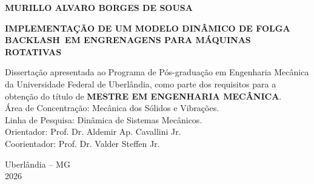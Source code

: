 
\thispagestyle{empty}

\begin{center}
	\large\bfseries\MakeUppercase{Murillo Alvaro Borges de Sousa}
\end{center}

\vspace*{\fill}
\begin{center}
	\large\bfseries\MakeUppercase{Implementação de um modelo dinâmico de folga backlash em engrenagens para máquinas rotativas}
\end{center}

\vskip48pt
\hfill
\begin{minipage}{10cm}
	Dissertação apresentada ao Programa de Pós-graduação em Engenharia Mecânica da Universidade Federal de Uberlândia, como parte dos requisitos para a obtenção do título de {\bfseries\MakeUppercase{Mestre em Engenharia Mecânica}}. \\
	\vskip 24pt
	Área de Concentração: Mecânica dos Sólidos e Vibrações. \\
	Linha de Pesquisa: Dinâmica de Sistemas Mecânicos. \\
	\vskip24pt
	Orientador: Prof. Dr. Aldemir Ap. Cavallini Jr.\\
	\vskip24pt
	Coorientador: Prof. Dr. Valder Steffen Jr.
\end{minipage}

\vspace*{\fill}
\begin{center}
	Uberlândia -- MG \\
	2026
\end{center}
